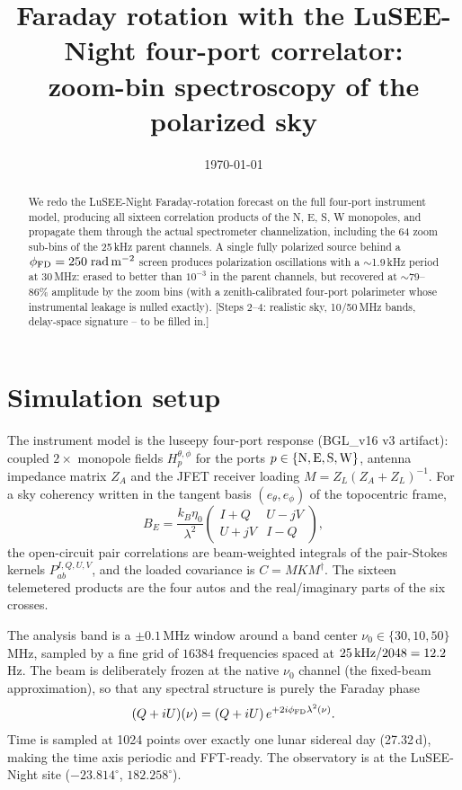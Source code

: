 \documentclass[11pt]{article}
\title{Faraday rotation with the LuSEE-Night four-port correlator:\\
  zoom-bin spectroscopy of the polarized sky}
\author{}
\date{\today}
\newcommand{\fd}{\phi_{\rm FD}}
\begin{document}
\maketitle

\begin{abstract}
We redo the LuSEE-Night Faraday-rotation forecast on the full
four-port instrument model, producing all sixteen correlation products
of the N, E, S, W monopoles, and propagate them through the actual
spectrometer channelization, including the 64 zoom sub-bins of the
25\,kHz parent channels.  A single fully polarized source behind a
$\fd = 250\;{\rm rad\,m^{-2}}$ screen produces polarization
oscillations with a $\sim$1.9\,kHz period at 30\,MHz: erased to
better than $10^{-3}$ in the parent channels, but recovered at
$\sim$79--86\% amplitude by the zoom bins (with a zenith-calibrated
four-port polarimeter whose instrumental leakage is nulled exactly).  [Steps 2--4: realistic
sky, 10/50\,MHz bands, delay-space signature -- to be filled in.]
\end{abstract}

\section{Simulation setup}
\label{sec:setup}

The instrument model is the luseepy four-port response (BGL\_v16 v3
artifact): coupled $2\times$ monopole fields $H^{\theta,\phi}_p$ for
the ports $p \in \{{\rm N,E,S,W}\}$, antenna impedance matrix $Z_A$
and the JFET receiver loading $M = Z_L (Z_A + Z_L)^{-1}$.  For a sky
coherency written in the tangent basis $(e_\theta, e_\phi)$ of the
topocentric frame,
\begin{equation}
  B_E = \frac{k_B \eta_0}{\lambda^2}
  \begin{pmatrix} I + Q & U - jV \\ U + jV & I - Q \end{pmatrix},
\end{equation}
the open-circuit pair correlations are beam-weighted integrals of the
pair-Stokes kernels $P^{I,Q,U,V}_{ab}$, and the loaded covariance is
$C = M K M^\dagger$.  The sixteen telemetered products are the four
autos and the real/imaginary parts of the six crosses.

The analysis band is a $\pm 0.1$\,MHz window around a band center
$\nu_0 \in \{30, 10, 50\}$\,MHz, sampled by a fine grid of
$16384$ frequencies spaced at $25\,{\rm kHz}/2048 = 12.2$\,Hz.  The
beam is deliberately frozen at the native $\nu_0$ channel (the
fixed-beam approximation), so that any spectral structure is purely
the Faraday phase
\begin{equation}
  (Q + iU)(\nu) = (Q + iU)\, e^{+2 i \fd \lambda^2(\nu)} .
\end{equation}
Time is sampled at 1024 points over exactly one lunar sidereal day
(27.32\,d), making the time axis periodic and FFT-ready.  The
observatory is at the LuSEE-Night site
($-23.814^\circ$, $182.258^\circ$).
\end{document}
